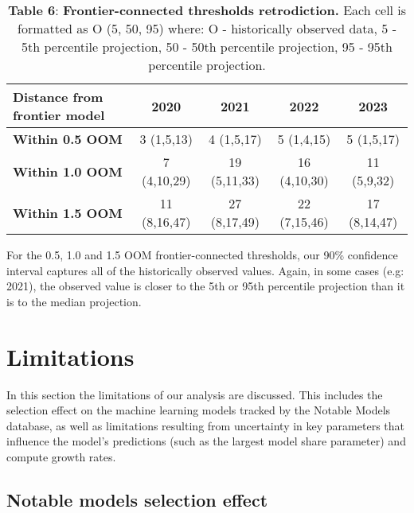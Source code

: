 \documentclass[11pt]{article}
\begin{document}
\begin{table}[h]
\centering
\caption*{\textbf{Table 6}: \textbf{Frontier-connected thresholds retrodiction.} Each cell is formatted as O (5, 50, 95) where: O - historically observed data, 5 - 5th percentile projection, 50 - 50th percentile projection, 95 - 95th percentile projection.}
\label{tab:frontier-retrodiction}
\begin{tabular}{|l|c|c|c|c|}
\hline
\textbf{Distance from frontier model} & \textbf{2020} & \textbf{2021} & \textbf{2022} & \textbf{2023} \\
\hline
\textbf{Within 0.5 OOM} & 3 (1,5,13) & 4 (1,5,17) & 5 (1,4,15) & 5 (1,5,17) \\
\hline
\textbf{Within 1.0 OOM} & 7 (4,10,29) & 19 (5,11,33) & 16 (4,10,30) & 11 (5,9,32) \\
\hline
\textbf{Within 1.5 OOM} & 11 (8,16,47) & 27 (8,17,49) & 22 (7,15,46) & 17 (8,14,47) \\
\hline
\end{tabular}
\end{table}

For the 0.5, 1.0 and 1.5 OOM frontier-connected thresholds, our 90\% confidence interval captures all of the historically observed values. Again, in some cases (e.g: 2021), the observed value is closer to the 5th or 95th percentile projection than it is to the median projection.

\section{Limitations}

In this section the limitations of our analysis are discussed. This includes the selection effect on the machine learning models tracked by the Notable Models database, as well as limitations resulting from uncertainty in key parameters that influence the model's predictions (such as the largest model share parameter) and compute growth rates.

\subsection{Notable models selection effect}
\label{notable-models-selection-effect}
\end{document}
